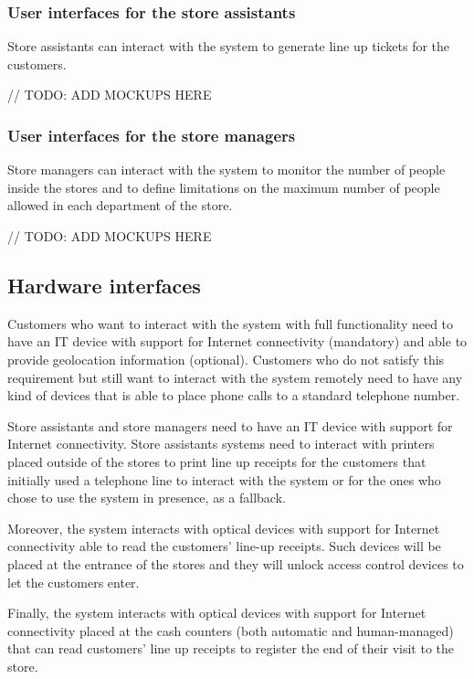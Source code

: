 \documentclass[../../main.tex]{subfiles}
\begin{document}
  \subsubsection{User interfaces for the store assistants}

  Store assistants can interact with the system to generate line up tickets for the customers.

  // TODO: ADD MOCKUPS HERE

  \subsubsection{User interfaces for the store managers}

  Store managers can interact with the system to monitor the number of people inside the stores and to define limitations on the maximum number of people allowed in each department of the store.

  // TODO: ADD MOCKUPS HERE

\subsection{Hardware interfaces}

Customers who want to interact with the system with full functionality need to have an IT device with support for Internet connectivity (mandatory) and able to provide geolocation information (optional). Customers who do not satisfy this requirement but still want to interact with the system remotely need to have any kind of devices that is able to place phone calls to a standard telephone number.

Store assistants and store managers need to have an IT device with support for Internet connectivity. Store assistants systems need to interact with printers placed outside of the stores to print line up receipts for the customers that initially used a telephone line to interact with the system or for the ones who chose to use the system in presence, as a fallback.

Moreover, the system interacts with optical devices with support for Internet connectivity able to read the customers' line-up receipts. 
Such devices will be placed at the entrance of the stores and they will unlock access control devices to let the customers enter. 

Finally, the system interacts with optical devices with support for Internet connectivity placed at the cash counters (both automatic and human-managed) that can read customers' line up receipts to register the end of their visit to the store.
\end{document}
